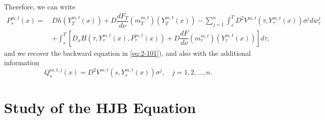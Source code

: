 \documentclass[11pt]{article}
\numberwithin{equation}{section}
\newcommand{\1}{\mbox{1\hspace{-1mm}I}}
\begin{document}
Therefore, we can write 
\begin{align*}
    P^{m,t}_s(x)=\ & Dh\left(Y^{m,t}_T(x)\right)+D\dfrac{dF_{T}}{d\nu}\left(m^{m,t}_T\right)\left(Y^{m,t}_T(x)\right) - \sum_{j=1}^n \int_s^T D^2 V^{m,t}\left(\tau,Y^{m,t}_\tau(x)\right)\sigma^j dw^j_\tau\\
    &+ \int_s^T \left[D_x H\left(\tau,Y^{m,t}_\tau(x),P^{m,t}_\tau(x)\right)+D\dfrac{dF}{d\nu}\left(m^{m,t}_\tau\right)\left(Y^{m,t}_\tau(x)\right)\right]d\tau,
\end{align*}
and we recover the backward equation in \eqref{eq:2-101}), and also with the additional information 
\begin{equation*}
    Q^{m,t,j}_s(x)=D^2 V^{m,t}\left(s,Y^{m,t}_s(x)\right)\sigma^{j},\quad j=1,2,\dots,n.
\end{equation*}

\section{Study of the HJB Equation}\label{sec:main}

\end{document}

